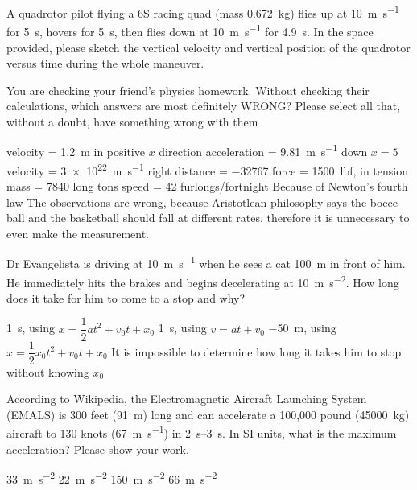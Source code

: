 \documentclass[exam,addpoints, noanswers]{exam}
\begin{document}
\begin{questions}
\question[5] A quadrotor pilot flying a 6S racing quad (mass \SI{0.672}{\kilo\gram}) flies up at \SI{10}{\meter\per\second} for \SI{5}{\second}, hovers for \SI{5}{\second}, then flies down at \SI{10}{\meter\per\second} for \SI{4.9}{\second}. In the space provided, please sketch the vertical velocity and vertical position of the quadrotor versus time during the whole maneuver. 



\question[5] You are checking your friend's physics homework. Without checking their calculations, which answers are most definitely WRONG? Please select all that, without a doubt, have something wrong with them
\begin{choices}
\CorrectChoice velocity = \SI{1.2}{\meter} in positive $x$ direction
\CorrectChoice acceleration = \SI{9.81}{\meter\per\second} down
\CorrectChoice $x = 5$ 
\CorrectChoice velocity = \SI{3e22}{\meter\per\second} right
\CorrectChoice distance = \num{-32767}
\choice force = \SI{1500}{lbf}, in tension
\choice mass = \num{7840} long tons
\choice speed = \num{42} furlongs/fortnight
\CorrectChoice Because of Newton's fourth law
\CorrectChoice The observations are wrong, because Aristotlean philosophy says the bocce ball and the basketball should fall at different rates, therefore it is unnecessary to even make the measurement. 
\end{choices}




\question[5] Dr Evangelista is driving at \SI{10}{\meter\per\second} when he sees a cat \SI{100}{\meter} in front of him. He immediately hits the brakes and begins decelerating at \SI{10}{\meter\per\second\squared}. How long does it take for him to come to a stop and why? 
\begin{choices}
\choice \SI{1}{\second}, using $x = \dfrac{1}{2} a t^2 + v_0 t + x_0$
\CorrectChoice \SI{1}{\second}, using $v = a t + v_0$
\choice \SI{-50}{\meter}, using $x = \dfrac{1}{2} x_0 t^2 + v_0 t + x_0$
\choice It is impossible to determine how long it takes him to stop without knowing $x_0$
\end{choices}




\question[5]According to Wikipedia, the Electromagnetic Aircraft Launching System (EMALS) is 300 feet (\SI{91}{\meter}) long and can accelerate a 100,000 pound (\SI{45000}{\kilogram}) aircraft to 130 knots (\SI{67}{\meter\per\second}) in \SIrange{2}{3}{\second}. In SI units, what is the maximum acceleration? Please show your work. 
\begin{choices}
\CorrectChoice \SI{33}{\meter\per\second\squared}
\choice \SI{22}{\meter\per\second\squared}
\choice \SI{150}{\meter\per\second\squared}
\choice \SI{66}{\meter\per\second\squared}
\end{choices}





\end{questions}
\end{document}
